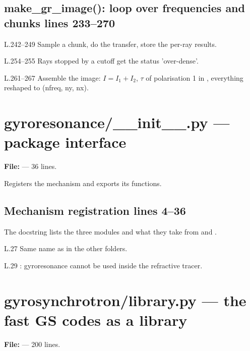 \section*{\normalsize make\_gr\_image(): loop over frequencies and chunks \hfill{\small\mdseries\color{gray}lines 233--270}}

\begin{lines}
\item[L.242–249] Sample a chunk, do the transfer, store the per-ray results.
\item[L.254–255] Rays stopped by a cutoff get the status 'over-dense'.
\item[L.261–267] Assemble the image: $I=I_1+I_2$, $\tau$ of polarisation 1 in , everything reshaped to (nfreq, ny, nx).
\end{lines}

\chapter{gyroresonance/\_\_init\_\_.py --- package interface}
\label{mod:gyroresonance:init.py}
\textbf{File:}  --- 36 lines.

Registers the mechanism and exports its functions.

\section*{\normalsize Mechanism registration \hfill{\small\mdseries\color{gray}lines 4--36}}

The docstring lists the three modules and what they take from  and .

\begin{lines}
\item[L.27] Same name as in the other folders.
\item[L.29] : gyroresonance cannot be used inside the refractive tracer.
\end{lines}

\chapter{gyrosynchrotron/library.py --- the fast GS codes as a library}
\label{mod:gyrosynchrotron:library.py}
\textbf{File:}  --- 200 lines.

